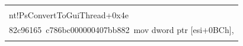  \begin{table}[h]\small %


  \begin{center}







  


  \begin{tabular}{|l|}


  \hline


  \\[-9pt]


{\sf nt!PsConvertToGuiThread+0x4e}\\


{\sf 82c96165\ c786bc000000407bb882\ mov dword ptr [esi+0BCh]},\\


\hspace*{5mm}{\sf offset\ nt!KeServiceDescriptorTable (82b87b40)}\\


\hline


\end{tabular}





\vspace*{-3pt}





\parbox{276pt}{


}


\end{center}


\vspace*{-9pt}


\end{table}


